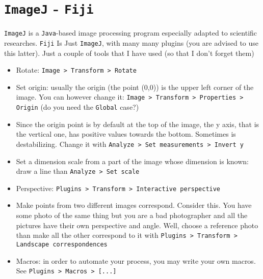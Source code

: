 \documentclass[a4paper,12pt,%
              final%
              ]{article}
\begin{document}
\section{\texttt{ImageJ} - \texttt{Fiji}}
\texttt{ImageJ} is a \texttt{Java}-based image processing program especially adapted to scientific researches. \texttt{Fiji} Is Just \texttt{ImageJ}, with many many plugins (you are advised to use this latter). Just a couple of tools that I have used (so that I don't forget them)
\begin{itemize}
  \item Rotate: \texttt{Image > Transform > Rotate}
  \item Set origin: usually the origin (the point (0,0)) is the upper left corner of the image. You can however change it: \texttt{Image > Transform > Properties > Origin} (do you need the \texttt{Global} case?)
  \item Since the origin point is by default at the top of the image, the y axis, that is the vertical one, has positive values towards the bottom. Sometimes is destabilizing. Change it with \texttt{Analyze > Set measurements > Invert y}
  \item Set a dimension scale from a part of the image whose dimension is known: draw a line than \texttt{Analyze > Set scale}
  \item Perspective: \texttt{Plugins > Transform > Interactive perspective}
  \item Make points from two different images correspond. Consider this. You have some photo of the same thing but you are a bad photographer and all the pictures have their own perspective and angle. Well, choose a reference photo than make all the other correspond to it with \texttt{Plugins > Transform > Landscape correspondences}
  \item Macros: in order to automate your process, you may write your own macros. See \texttt{Plugins > Macros > [...]}
\end{itemize}

\end{document}
